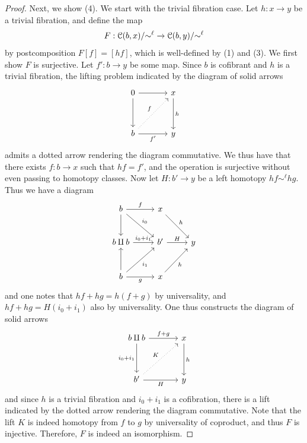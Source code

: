 \begin{proof}
	Next, we show (4). We start with the trivial fibration case. Let $h : x \to y$ be a trivial fibration, and define the map
	\[
		F : \mathcal{C} (b,x) / \mathbin{\sim}^\ell  \to \mathcal{C} (b,y) / \mathbin{\sim}^\ell 
	\]
	by postcomposition $F[f]=[hf]$, which is well-defined by (1) and (3). We first show $F$ is surjective. Let $f': b \to y$ be some map. Since $b$ is cofibrant and $h$ is a trivial fibration, the lifting problem indicated by the diagram of solid arrows
	\[\begin{tikzcd}[row sep = 3.5em, column sep = 3.5em]
	0 \ar[r] \ar[d]  & x\ar[" h ", d]  \\
	b \ar[" f' "', r] \ar[" f ", dotted, ur]  & y
	\end{tikzcd}\]
	admits a dotted arrow rendering the diagram commutative. We thus have that there exists $f : b \to x$ such that $hf=f'$, and the operation is surjective without even passing to homotopy classes. Now let $H : b' \to y$ be a left homotopy $hf \sim^\ell hg$. Thus we have a diagram
	\[\begin{tikzcd}[row sep = 2.5em, column sep = 2.5em]
	b \ar[d] \ar[" f ", r] \ar[" i_0 ", dr]  & x \ar[" h ", dr]  &  \\
	b\amalg b \ar[" i_0+i_1 ", r]  & b' \ar[" H ", r]  & y \\
	b \ar[u] \ar[" i_1 "', ur] \ar[" g "', r]  & x \ar[" h "', ur]  & 
	\end{tikzcd}\]
	and one notes that $hf+hg=h(f+g)$ by universality, and $hf+hg=H(i_0+i_1)$ also by universality. One thus constructs the diagram of solid arrows
	\[\begin{tikzcd}[row sep = 3.5em, column sep = 3.5em]
	b\amalg b \ar[" f+g ", r] \ar[" i_0+i_1 "', d]  & x \ar[" h ", d]  \\
	b' \ar[" H "', r] \ar[" K ", dotted, ur]  & y
	\end{tikzcd}\]
	and since $h$ is a trivial fibration and $i_0+i_1$ is a cofibration, there is a lift indicated by the dotted arrow rendering the diagram commutative. Note that the lift $K$ is indeed homotopy from $f$ to $g$ by universality of coproduct, and thus $F$ is injective. Therefore, $F$ is indeed an isomorphism.


\end{proof}
